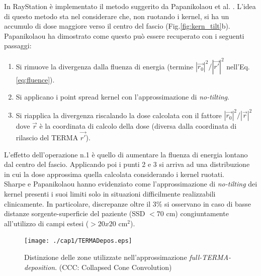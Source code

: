 {In RayStation è implementato il metodo suggerito da Papanikolaou et al. \cite{Papanikolaou1993}. L'idea di questo metodo sta nel considerare che, non ruotando i kernel, si ha un accumulo di dose maggiore verso il centro del fascio (Fig.\ref{fig:kern_tilt}b).\\ 
Papanikolaou ha dimostrato come questo può essere recuperato con i seguenti passaggi:
\begin{enumerate}
\item Si rimuove la divergenza dalla fluenza di energia (termine $|\vec{r_0}|^2/|\vec{r'}|^2$ nell'Eq.\eqref{eq:fluence}).
\item Si applicano i point spread kernel con l'approssimazione di \textit{no-tilting}.
\item Si riapplica la divergenza riscalando la dose calcolata con il fattore $|\vec{r_0}|^2/|\vec{r}|^2$ dove $\vec{r}$ è la coordinata di calcolo della dose (diversa dalla coordinata di rilascio del TERMA $\vec{r'}$).
\end{enumerate}
L'effetto dell'operazione n.1 è quello di aumentare la fluenza di energia lontano dal centro del fascio. Applicando poi i punti 2 e 3 si arriva ad una distribuzione in cui la dose approssima quella calcolata considerando i kernel ruotati.\\
Sharpe e Papanikolaou \cite{Sharpe1997,Papanikolaou1993} hanno evidenziato come l'approssimazione di \textit{no-tilting} dei kernel presenti i suoi limiti solo in situazioni difficilmente realizzabili clinicamente. In particolare, discrepanze oltre il 3\% si osservano in caso di basse distanze sorgente-superficie del paziente (SSD $< 70$ cm) congiuntamente all'utilizzo di campi estesi ($> 20x20$ cm$^2$).

\begin{figure}
\centering
\texttt{[image: ./cap1/TERMADepos.eps]}
\caption{Distinzione delle zone utilizzate nell'approssimazione \textit{full-TERMA-deposition}. (CCC: Collapsed Cone Convolution)}
\label{fig:TERMADepos}
\end{figure}

}
